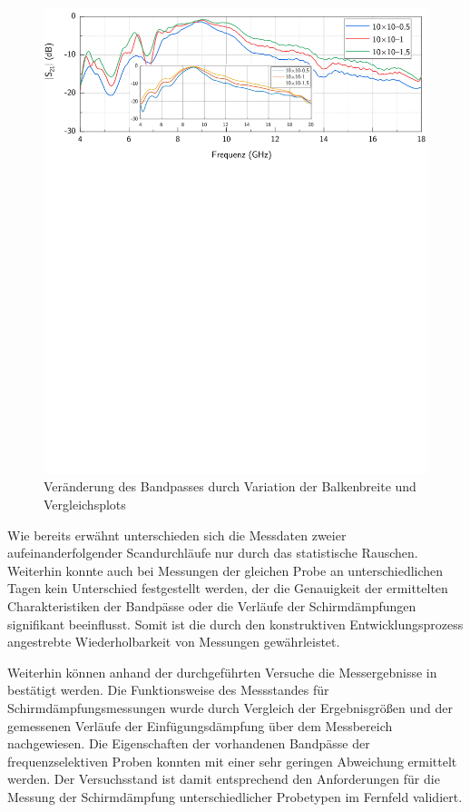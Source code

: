 \begin{figure}[H]
    \centering
    \includegraphics[page=1, width=.99\textwidth, trim = 0cm 13.3cm 0cm 0cm, clip]{Abbildungen/Kapitel4/Messergebnisse/Vergleich_10x10.pdf}
    \caption[Veränderung des Bandpasses durch Variation der Balkenbreite]{Veränderung des Bandpasses durch Variation der Balkenbreite und Vergleichsplots~\cite{FSS_Toedter_Diplomarbeit}}\label{fig:4_Variation_Balkenbreite}
\end{figure}


Wie bereits erwähnt unterschieden sich die Messdaten zweier aufeinanderfolgender Scandurchläufe nur durch das statistische Rauschen. Weiterhin konnte auch bei Messungen der gleichen Probe an unterschiedlichen Tagen kein Unterschied festgestellt werden, der die Genauigkeit der ermittelten Charakteristiken der Bandpässe oder die Verläufe der Schirmdämpfungen signifikant beeinflusst. Somit ist die durch den konstruktiven Entwicklungsprozess angestrebte Wiederholbarkeit von Messungen gewährleistet. 
\par
\vspace{\linespace}
Weiterhin können anhand der durchgeführten Versuche die Messergebnisse in~\cite{FSS_Toedter_Diplomarbeit} bestätigt werden. Die Funktionsweise des Messstandes für Schirmdämpfungsmessungen wurde durch Vergleich der Ergebnis\-größen und der gemessenen Verläufe der Einfügungsdämpfung über dem Messbereich nachgewiesen. Die Eigenschaften der vorhandenen Bandpässe der frequenzselektiven Proben konnten mit einer sehr geringen Abweichung ermittelt werden. Der Versuchsstand ist damit entsprechend den Anforderungen für die Messung der Schirmdämpfung unterschiedlicher Probetypen im Fernfeld validiert. 




